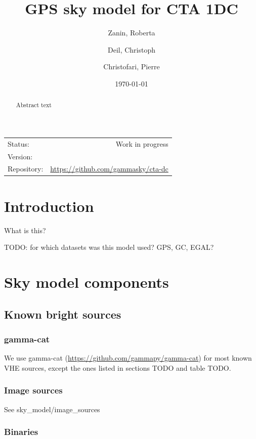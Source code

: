 \documentclass{article}
\title{GPS sky model for CTA 1DC}
\author{
  Zanin, Roberta
  \and
  Deil, Christoph
  \and
  Christofari, Pierre
}
\newcommand{\urlGammaCat}{\url{https://github.com/gammapy/gamma-cat}}
\begin{document}
\maketitle

\begin{center}
\begin{tabular}{lr}
Status: & Work in progress \\
Version: & \date{\today} \\
Repository: & \url{https://github.com/gammasky/cta-dc} \\
\end{tabular}
\end{center}

\begin{abstract}
Abstract text
\end{abstract}

\section{Introduction}

What is this?

TODO: for which datasets was this model used? GPS, GC, EGAL?

\section{Sky model components}

\subsection{Known bright sources}

\subsubsection{gamma-cat}

We use gamma-cat (\urlGammaCat) for most known VHE sources,
except the ones listed in sections TODO and table TODO.

\subsubsection{Image sources}

See sky\_model/image\_sources

\subsubsection{Binaries}
\end{document}
